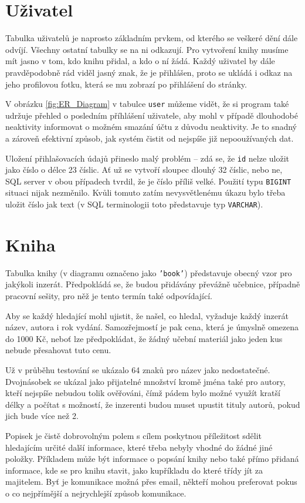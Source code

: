 \documentclass[a4paper,oneside,12pt]{report}
\begin{document}
\section{Uživatel}
Tabulka uživatelů je naprosto základním prvkem, od kterého se veškeré dění dále odvíjí.
Všechny ostatní tabulky se na ni odkazují. Pro vytvoření knihy musíme mít jasno v tom, kdo
knihu přidal, a kdo o ní žádá. Každý uživatel by dále pravděpodobně rád viděl jasný znak,
že je přihlášen, proto se ukládá i odkaz na jeho profilovou fotku, která se mu zobrazí po
přihlášení do stránky.

V obrázku \ref{fig:ER_Diagram} v tabulce \texttt{user} můžeme vidět, že si
program také udržuje přehled o\,\,posledním příhlášení uživatele, aby mohl v případě
dlouhodobé neaktivity informovat o možném smazání účtu z důvodu neaktivity. Je to snadný a
zároveň efektivní způsob, jak systém čistit od nejspíše již nepooužívaných dat.

Uložení přihlašovacích údajů přineslo malý problém -- zdá se, že \texttt{id}
nelze uložit jako číslo o délce 23 číslic. Ať už se vytvoří sloupec dlouhý 32 číslic, nebo
ne, SQL server v obou případech tvrdil, že je číslo příliš velké. Použití typu
\texttt{BIGINT} situaci nijak nezměnilo. Kvůli tomuto zatím nevysvětlenému úkazu
bylo třeba uložit číslo jak text (v SQL terminologii toto představuje typ
\texttt{VARCHAR}).

\newpage
\section{Kniha}
Tabulka knihy (v diagramu označeno jako \texttt{'book'}) představuje obecný vzor
pro jakýkoli inzerát. Předpokládá se, že budou přidávány převážně učebnice, případně
pracovní sešity, pro něž je tento termín také odpovídající.

Aby se každý hledající mohl ujistit, že našel, co hledal, vyžaduje každý inzerát název,
autora i rok vydání. Samozřejmostí je pak cena, která je úmyslně omezena do 1000 Kč, neboť
lze předpokládat, že žádný učební materiál jako jeden kus nebude přesahovat tuto cenu.

Už v průběhu testování se ukázalo 64 znaků pro název jako nedostatečné. Dvojnásobek se
ukázal jako přijatelné množství kromě jména také pro autory, kteří nejspíše nebudou tolik
ověřováni, čímž pádem bylo možné využít kratší délky a počítat s možností, že inzerenti
budou muset upustit tituly autorů, pokud jich bude více než 2.

Popisek je čistě dobrovolným polem s cílem poskytnou příležitost sdělit hledajícím určité
další informace, které třeba nebyly vhodné do žádné jiné položky. Příkladem může být
informace o popsání knihy nebo také přímo přidaná informace, kde se pro knihu stavit, jako
kupříkladu do které třídy jít za majitelem. Byť je komunikace možná přes email, někteří
mohou preferovat pokus o co nejpřímější a nejrychlejší způsob komunikace.
\end{document}

